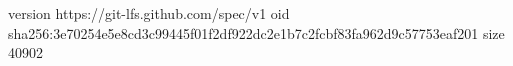 version https://git-lfs.github.com/spec/v1
oid sha256:3e70254e5e8cd3c99445f01f2df922dc2e1b7c2fcbf83fa962d9c57753eaf201
size 40902
